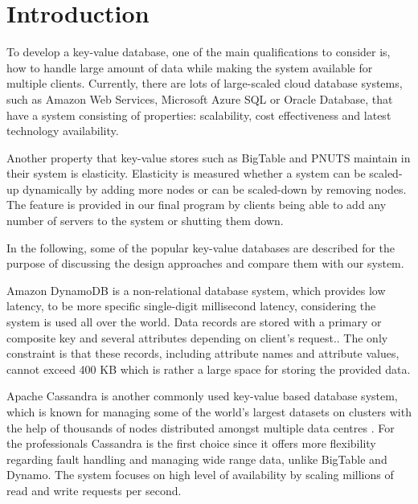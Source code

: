 \section{Introduction}
\label{sec:introduction}

To develop a key-value database, one of the main qualifications to consider is, how to handle large amount of data while making the system available for multiple clients. Currently, there are lots of large-scaled cloud database systems, such as Amazon Web Services, Microsoft Azure SQL or Oracle Database, that have a system consisting of properties: scalability, cost effectiveness and latest technology availability. 

Another property that key-value stores such as BigTable and PNUTS maintain in their system is elasticity. Elasticity is measured whether a system can be scaled-up dynamically by adding more nodes or can be scaled-down by removing nodes\cite{agrawal2011database}. The feature is provided in our final program by clients being able to add any number of servers to the system or shutting them down.

In the following, some of the popular key-value databases are described for the purpose of discussing the design approaches and compare them with our system.

Amazon DynamoDB is a non-relational database system, which provides low latency, to be more specific single-digit millisecond latency\cite{amazon}, considering the system is used all over the world. Data records are stored with a primary or composite key and several attributes depending on client's request.\cite{kalid2017big}. The only constraint is that these records, including attribute names and attribute values, cannot exceed 400 KB which is rather a large space for storing the provided data\cite{amazon}.

Apache Cassandra is another commonly used key-value based database system, which is known for managing some of the world's largest datasets on clusters with the help of thousands of nodes distributed amongst multiple data centres \cite{chebotko2015big}. For the professionals Cassandra is the first choice since it offers more flexibility regarding fault handling and managing wide range data, unlike BigTable and Dynamo\cite{kalid2017big}. The system focuses on high level of availability by scaling millions of read and write requests per second.

